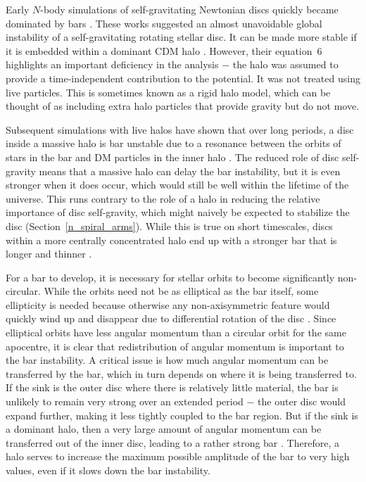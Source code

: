 \documentclass[fleqn,usenatbib,useAMS]{mnras} %
\begin{document}
Early $N$-body simulations of self-gravitating Newtonian discs quickly became dominated by bars \citep{Miller_1968, Hockney_1969, Hohl_1971}. These works suggested an almost unavoidable global instability of a self-gravitating rotating stellar disc. It can be made more stable if it is embedded within a dominant CDM halo \citep{Ostriker_Peebles_1973}. However, their equation~6 highlights an important deficiency in the analysis $-$ the halo was assumed to provide a time-independent contribution to the potential. It was not treated using live particles. This is sometimes known as a rigid halo model, which can be thought of as including extra halo particles that provide gravity but do not move.

Subsequent simulations with live halos have shown that over long periods, a disc inside a massive halo is bar unstable due to a resonance between the orbits of stars in the bar and DM particles in the inner halo \citep{Athanassoula_2002}. The reduced role of disc self-gravity means that a massive halo can delay the bar instability, but it is even stronger when it does occur, which would still be well within the lifetime of the universe. This runs contrary to the role of a halo in reducing the relative importance of disc self-gravity, which might naively be expected to stabilize the disc (Section~\ref{n_spiral_arms}). While this is true on short timescales, discs within a more centrally concentrated halo end up with a stronger bar that is longer and thinner \citep{Athanassoula_Misiriotis_2002}.

For a bar to develop, it is necessary for stellar orbits to become significantly non-circular. While the orbits need not be as elliptical as the bar itself, some ellipticity is needed because otherwise any non-axisymmetric feature would quickly wind up and disappear due to differential rotation of the disc \citep{Lin_1964}. Since elliptical orbits have less angular momentum than a circular orbit for the same apocentre, it is clear that redistribution of angular momentum is important to the bar instability. A critical issue is how much angular momentum can be transferred by the bar, which in turn depends on where it is being transferred to. If the sink is the outer disc where there is relatively little material, the bar is unlikely to remain very strong over an extended period $-$ the outer disc would expand further, making it less tightly coupled to the bar region. But if the sink is a dominant halo, then a very large amount of angular momentum can be transferred out of the inner disc, leading to a rather strong bar \citep{Athanassoula_2003}. Therefore, a halo serves to increase the maximum possible amplitude of the bar to very high values, even if it slows down the bar instability.
\end{document}
